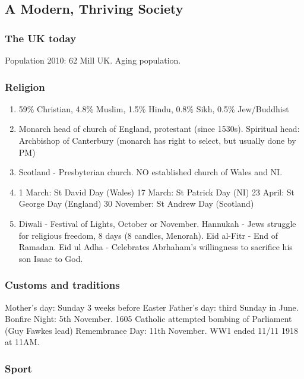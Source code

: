 \documentclass[10pt,reqno]{amsart}
\begin{document}
\subsection{A Modern, Thriving Society}

\subsubsection{The UK today} Population 2010: 62 Mill UK. Aging population. 

\subsubsection{Religion}

\begin{enumerate}[i]
\item 59\% Christian, 4.8\% Muslim, 1.5\% Hindu, 0.8\% Sikh, 0.5\% Jew/Buddhist 
\item Monarch head of church of England, protestant (since 1530s). Spiritual head: Archbishop of Canterbury (monarch has right to select, but usually done by PM)
\item Scotland - Presbyterian church. NO established church of Wales and NI. 
\item 1 March: St David Day (Wales)
17 March: St Patrick Day (NI)
23 April: St George Day (England)
30 November: St Andrew Day (Scotland)
\item 
Diwali - Festival of Lights, October or November.
Hannukah - Jews struggle for religious freedom, 8 days (8 candles, Menorah).
Eid al-Fitr - End of Ramadan.
Eid ul Adha - Celebrates Abrhaham's willingness to sacrifice his son Isaac to God.
\end{enumerate}


\subsubsection{Customs and traditions} Mother's day: Sunday 3 weeks before Easter
Father's day: third Sunday in June.
Bonfire Night: 5th November. 1605 Catholic attempted bombing of Parliament (Guy Fawkes lead)
Remembrance Day: 11th November. WW1 ended 11/11 1918 at 11AM. 


\subsubsection{Sport}
\end{document}
